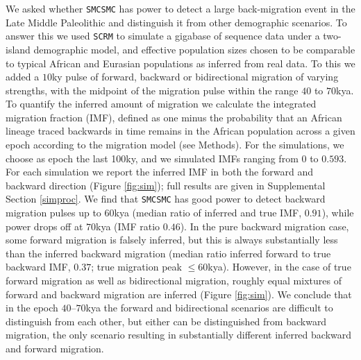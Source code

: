 \documentclass{article}
\begin{document}
We asked whether {\tt SMCSMC} has power to detect a large back-migration event in the Late Middle Paleolithic and distinguish it from other demographic scenarios. To answer this we used {\tt SCRM} \cite{Staab2015} to simulate a gigabase of sequence data under a two-island demographic model,
and effective population sizes chosen to be comparable to typical African and Eurasian populations as inferred from real data. 
To this we added a $10$ky pulse of forward, backward or bidirectional migration of varying strengths, with the midpoint of the migration pulse within the range $40$ to $70$kya.  To quantify the inferred amount of migration we calculate the integrated migration fraction (IMF), defined as one minus the probability that an African lineage traced backwards in time remains in the African population across a given epoch according to the migration model (see Methods).  For the simulations, we choose as epoch the last 100ky, and we simulated IMFs ranging from $0$ to $0.593$.
For each simulation we report the inferred IMF in both the forward and backward direction (Figure \ref{fig:sim}); full results are given in Supplemental Section \ref{simproc}.  We find that {\tt SMCSMC} has good power to detect backward migration pulses up to $60$kya (median ratio of inferred and true IMF, $0.91$), while power drops off at $70$kya (IMF ratio $0.46$). In the pure backward migration case, some forward migration is falsely inferred, but this is always substantially less than the inferred backward migration (median ratio inferred forward to true backward IMF, $0.37$; true migration peak $\leq 60$kya).  However, in the case of true forward migration as well as bidirectional migration, roughly equal mixtures of forward and backward migration are inferred (Figure \ref{fig:sim}). We conclude that in the epoch $40$--$70$kya the forward and bidirectional scenarios are difficult to distinguish from each other, but either can be distinguished from backward migration, the only scenario resulting in substantially different inferred backward and forward migration.
\end{document}
